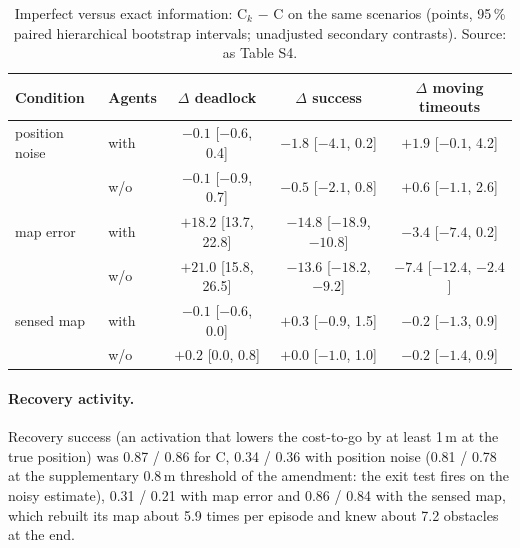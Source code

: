 \documentclass[11pt]{article}
\begin{document}
\begin{table}[htbp]
\centering\small
\caption{Imperfect versus exact information: C$_k$ $-$ C on the same scenarios (points, 95\,\% paired hierarchical bootstrap intervals; unadjusted secondary contrasts). Source: as Table S4.}
\begin{tabular}{@{}llccc@{}}
\toprule
Condition & Agents & $\Delta$ deadlock & $\Delta$ success & $\Delta$ moving timeouts \\
\midrule
position noise & with & $-0.1$ [$-0.6$, 0.4] & $-1.8$ [$-4.1$, 0.2] & $+1.9$ [$-0.1$, 4.2] \\
 & w/o & $-0.1$ [$-0.9$, 0.7] & $-0.5$ [$-2.1$, 0.8] & $+0.6$ [$-1.1$, 2.6] \\
map error & with & $+18.2$ [13.7, 22.8] & $-14.8$ [$-18.9$, $-10.8$] & $-3.4$ [$-7.4$, 0.2] \\
 & w/o & $+21.0$ [15.8, 26.5] & $-13.6$ [$-18.2$, $-9.2$] & $-7.4$ [$-12.4$, $-2.4$] \\
sensed map & with & $-0.1$ [$-0.6$, 0.0] & $+0.3$ [$-0.9$, 1.5] & $-0.2$ [$-1.3$, 0.9] \\
 & w/o & $+0.2$ [0.0, 0.8] & $+0.0$ [$-1.0$, 1.0] & $-0.2$ [$-1.4$, 0.9] \\
\bottomrule
\end{tabular}
\end{table}

\paragraph{Recovery activity.} Recovery success (an activation that lowers the cost-to-go by at least 1\,m at the true position) was 0.87 / 0.86 for C, 0.34 / 0.36 with position noise (0.81 / 0.78 at the supplementary 0.8\,m threshold of the amendment: the exit test fires on the noisy estimate), 0.31 / 0.21 with map error and 0.86 / 0.84 with the sensed map, which rebuilt its map about 5.9 times per episode and knew about 7.2 obstacles at the end.
\end{document}

